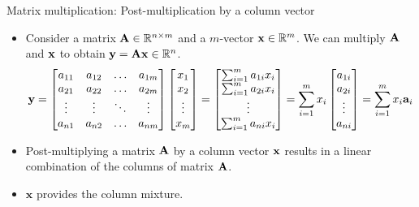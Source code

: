 \documentclass[aspectratio=169]{beamer}
\begin{document}
\begin{frame}[t]{Matrix multiplication: Post-multiplication by a column vector}
  \begin{itemize}
    \item Consider a matrix $\mathbf{A} \in \mathbb{R}^{n \times m}$ and a $m$-vector $\mathbf{x} \in \mathbb{R}^m$. We can multiply $\mathbf{A}$ and $\mathbf{x}$ to obtain $\mathbf{y} = \mathbf{A}\mathbf{x} \in \mathbb{R}^n$.
    \[ \mathbf{y} = \begin{bmatrix}
      a_{11} & a_{12} & \ldots & a_{1m} \\
      a_{21} & a_{22} & \ldots & a_{2m} \\
      \vdots & \vdots & \ddots & \vdots \\
      a_{n1} & a_{n2} & \ldots & a_{nm} \\
    \end{bmatrix}\begin{bmatrix}
      x_1\\ x_2 \\ \vdots \\ x_{m}
    \end{bmatrix} = \begin{bmatrix}
      \sum_{i=1}^ma_{1i}x_i\\ \sum_{i=1}^ma_{2i}x_i \\ \vdots \\ \sum_{i=1}^ma_{ni}x_i
    \end{bmatrix} = \sum_{i=1}^mx_i\begin{bmatrix}
      a_{1i} \\ a_{2i} \\ \vdots \\ a_{ni}
    \end{bmatrix} = \sum_{i=1}^mx_i \mathbf{a}_{i} \]
    \item Post-multiplying a matrix $\mathbf{A}$ by a column vector $\mathbf{x}$ results in a linear combination of the columns of matrix $\mathbf{A}$.
    
    \item $\mathbf{x}$ provides the column mixture.
  \end{itemize}
\end{frame}
\end{document}
